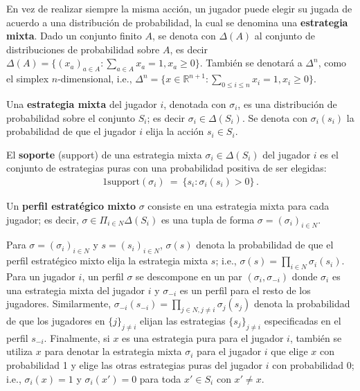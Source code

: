 En vez de realizar siempre la misma acción, un jugador puede elegir su jugada de acuerdo a una distribución de probabilidad, la cual se denomina una \textbf{estrategia mixta}. Dado un conjunto finito $A$, se denota con $\Delta(A)$ al conjunto de distribuciones de probabilidad sobre $A$, es decir $\Delta(A) = \{ (x_a)_{a \in A} : \sum_{a \in A} x_a = 1, x_a \geq 0\}$. También se denotará a $\Delta^n$, como el simplex $n$-dimensional, i.e., $\Delta^n = \{ x \in \mathbb{R}^{n+1} : \sum_{0 \leq i \leq n}x_i = 1, x_i \geq 0 \}$.

\begin{definition} Una \textbf{estrategia mixta} del jugador $i$, denotada con $\sigma_i$, es una distribución de probabilidad sobre el conjunto $S_i$; es decir $\sigma_i \in \Delta(S_i)$. Se denota con $\sigma_i(s_i)$ la probabilidad de que el jugador $i$ elija la acción $s_i \in S_i$. 
\end{definition}

\begin{definition}
El \textbf{soporte} (support) de una estrategia mixta $\sigma_i \in \Delta(S_i)$ del jugador $i$ es el conjunto de estrategias puras con una probabilidad positiva de ser elegidas:
\begin{alignat}{1}
\text{support}(\sigma_i)\ =\ \{s_i : \sigma_i(s_i) > 0 \} \,.
\end{alignat}
\end{definition}

\begin{definition}
Un \textbf{perfil estratégico mixto} $\sigma$ consiste en una estrategia mixta para cada jugador; es decir, $\sigma \in \Pi_{i \in N} \Delta(S_i)$ es una tupla de forma $\sigma=(\sigma_i)_{i \in N}$.
\end{definition}

Para $\sigma = (\sigma_i)_{i \in N}$ y $s = (s_i)_{i \in N}$, $\sigma(s)$ denota la probabilidad de que el perfil estratégico mixto elija la estrategia mixta $s$; i.e., $\sigma(s)=\prod_{i\in N} \sigma_i(s_i)$. Para un jugador $i$, un perfil $\sigma$ se descompone en un par $(\sigma_i,\sigma_{-i})$ donde $\sigma_i$ es una estrategia mixta del jugador $i$ y $\sigma_{-i}$ es un perfil para el resto de los jugadores. Similarmente, $\sigma_{-i}(s_{-i})=\prod_{j\in N,j\neq i}\sigma_j(s_j)$ denota la probabilidad de que los jugadores en $\{j\}_{j\neq i}$ elijan las estrategias $\{s_j\}_{j\neq i}$ especificadas en el perfil $s_{-i}$. Finalmente, si $x$ es una estrategia pura para el jugador $i$, también se utiliza $x$ para denotar la estrategia mixta $\sigma_i$ para el jugador $i$ que elige $x$ con probabilidad 1 y elige las otras estrategias puras del jugador $i$ con probabilidad 0; i.e., $\sigma_i(x)=1$ y $\sigma_i(x')=0$ para toda $x'\in S_i$ con $x' \neq x$.

